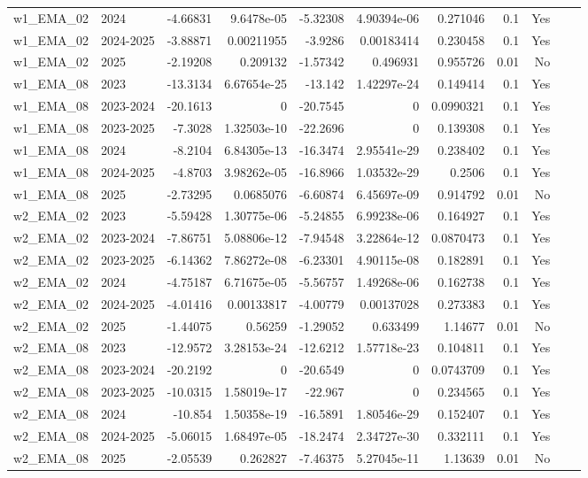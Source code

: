 \begin{longtable}{llrrrrrrrrl}
w1\_EMA\_02 & 2024 & -4.66831 & 9.6478e-05 & -5.32308 & 4.90394e-06 & 0.271046 & 0.1 & Yes \\
w1\_EMA\_02 & 2024-2025 & -3.88871 & 0.00211955 & -3.9286 & 0.00183414 & 0.230458 & 0.1 & Yes \\
w1\_EMA\_02 & 2025 & -2.19208 & 0.209132 & -1.57342 & 0.496931 & 0.955726 & 0.01 & No \\
w1\_EMA\_08 & 2023 & -13.3134 & 6.67654e-25 & -13.142 & 1.42297e-24 & 0.149414 & 0.1 & Yes \\
w1\_EMA\_08 & 2023-2024 & -20.1613 & 0 & -20.7545 & 0 & 0.0990321 & 0.1 & Yes \\
w1\_EMA\_08 & 2023-2025 & -7.3028 & 1.32503e-10 & -22.2696 & 0 & 0.139308 & 0.1 & Yes \\
w1\_EMA\_08 & 2024 & -8.2104 & 6.84305e-13 & -16.3474 & 2.95541e-29 & 0.238402 & 0.1 & Yes \\
w1\_EMA\_08 & 2024-2025 & -4.8703 & 3.98262e-05 & -16.8966 & 1.03532e-29 & 0.2506 & 0.1 & Yes \\
w1\_EMA\_08 & 2025 & -2.73295 & 0.0685076 & -6.60874 & 6.45697e-09 & 0.914792 & 0.01 & No \\
w2\_EMA\_02 & 2023 & -5.59428 & 1.30775e-06 & -5.24855 & 6.99238e-06 & 0.164927 & 0.1 & Yes \\
w2\_EMA\_02 & 2023-2024 & -7.86751 & 5.08806e-12 & -7.94548 & 3.22864e-12 & 0.0870473 & 0.1 & Yes \\
w2\_EMA\_02 & 2023-2025 & -6.14362 & 7.86272e-08 & -6.23301 & 4.90115e-08 & 0.182891 & 0.1 & Yes \\
w2\_EMA\_02 & 2024 & -4.75187 & 6.71675e-05 & -5.56757 & 1.49268e-06 & 0.162738 & 0.1 & Yes \\
w2\_EMA\_02 & 2024-2025 & -4.01416 & 0.00133817 & -4.00779 & 0.00137028 & 0.273383 & 0.1 & Yes \\
w2\_EMA\_02 & 2025 & -1.44075 & 0.56259 & -1.29052 & 0.633499 & 1.14677 & 0.01 & No \\
w2\_EMA\_08 & 2023 & -12.9572 & 3.28153e-24 & -12.6212 & 1.57718e-23 & 0.104811 & 0.1 & Yes \\
w2\_EMA\_08 & 2023-2024 & -20.2192 & 0 & -20.6549 & 0 & 0.0743709 & 0.1 & Yes \\
w2\_EMA\_08 & 2023-2025 & -10.0315 & 1.58019e-17 & -22.967 & 0 & 0.234565 & 0.1 & Yes \\
w2\_EMA\_08 & 2024 & -10.854 & 1.50358e-19 & -16.5891 & 1.80546e-29 & 0.152407 & 0.1 & Yes \\
w2\_EMA\_08 & 2024-2025 & -5.06015 & 1.68497e-05 & -18.2474 & 2.34727e-30 & 0.332111 & 0.1 & Yes \\
w2\_EMA\_08 & 2025 & -2.05539 & 0.262827 & -7.46375 & 5.27045e-11 & 1.13639 & 0.01 & No \\
\end{longtable}

